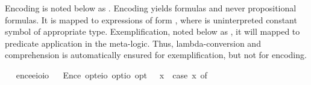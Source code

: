 \begin{isabellebody}
\begin{isamarkuptext}
  Encoding  is noted below as .
  Encoding yields formulas and never propositional formulas. It is mapped to expressions of 
  form , where  is uninterpreted constant symbol of appropriate 
  type. Exemplification, noted below as , it will mapped to predicate 
  application in the meta-logic. Thus, lambda-conversion and comprehension is 
  automatically ensured for exemplification, but not for encoding.
\end{isamarkuptext}%
\isamarkuptrue%
\ \isamarkupfalse%
\ enc{\isacharcolon}{\isacharcolon}{\isachardoublequoteopen}e{\isasymRightarrow}{\isacharparenleft}e{\isasymRightarrow}io{\isacharparenright}{\isasymRightarrow}io{\isachardoublequoteclose}\isanewline
\ \isamarkupfalse%
\ Enc{\isacharcolon}{\isacharcolon}{\isachardoublequoteopen}e\ opt{\isasymRightarrow}{\isacharparenleft}e{\isasymRightarrow}io{\isacharparenright}\ opt{\isasymRightarrow}io\ opt{\isachardoublequoteclose}\ {\isacharparenleft}{\isachardoublequoteopen}{\isasymlbrace}{\isacharunderscore}{\isacharcomma}{\isacharunderscore}{\isasymrbrace}{\isachardoublequoteclose}{\isacharparenright}\ \ {\isachardoublequoteopen}{\isasymlbrace}x{\isacharcomma}{\isasymPhi}{\isasymrbrace}\ {\isasymequiv}\ case\ {\isacharparenleft}x{\isacharcomma}{\isasymPhi}{\isacharparenright}\ of\ \isanewline

\end{isabellebody}
